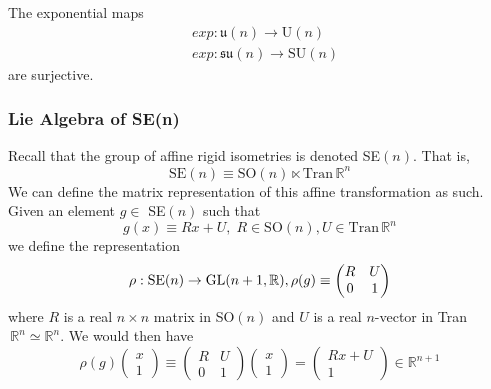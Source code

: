     \begin{theorem}
    The exponential maps 
    \begin{align*}
      & exp: \mathfrak{u}(n) \rightarrow \text{U}(n) \\
      & exp: \mathfrak{su}(n) \rightarrow \text{SU}(n)
    \end{align*}
    are surjective. 
    \end{theorem}

  \subsubsection{Lie Algebra of SE(n)}

    Recall that the group of affine rigid isometries is denoted SE$(n)$. That is, 
    \begin{equation}
      \text{SE}(n) \equiv \text{SO}(n) \ltimes \text{Tran}\,\mathbb{R}^n
    \end{equation}
    We can define the matrix representation of this affine transformation as such. Given an element $g \in$ SE$(n)$ such that
    \begin{equation}
      g(x) \equiv R x + U, \; R \in \text{SO}(n), U \in \text{Tran}\, \mathbb{R}^n 
    \end{equation}
    we define the representation
    \begin{equation}
      \rho: \text{SE}(n) \rightarrow \GL(n+1, \mathbb{R}), \rho(g) \equiv \begin{pmatrix}
      R&U\\0&1
      \end{pmatrix}
    \end{equation}
    where $R$ is a real $n\times n$ matrix in SO$(n)$ and $U$ is a real $n$-vector in Tran$\,\mathbb{R}^n \simeq \mathbb{R}^n$. We would then have
    \begin{equation}
      \rho(g) \begin{pmatrix}
      x\\1
      \end{pmatrix} \equiv \begin{pmatrix}
      R&U\\0&1
      \end{pmatrix} \begin{pmatrix}
      x\\1
      \end{pmatrix} = \begin{pmatrix}
      R x + U\\1
      \end{pmatrix} \in \mathbb{R}^{n+1}
    \end{equation}

